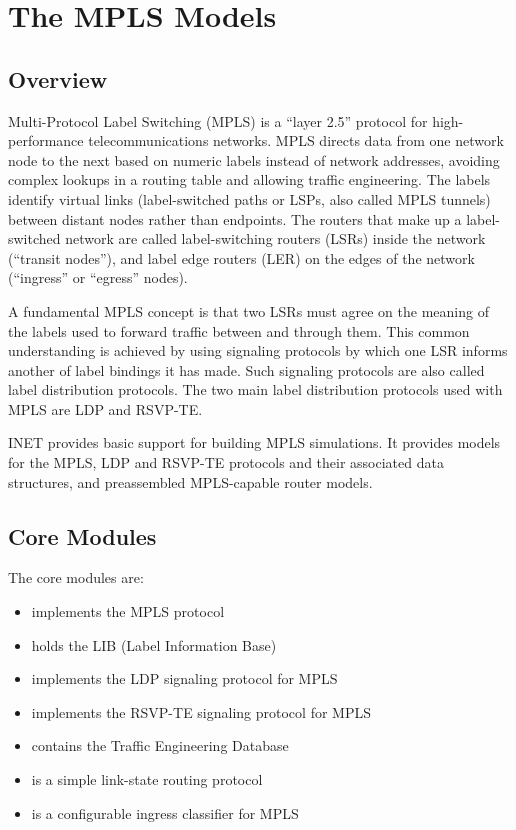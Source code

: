 \chapter{The MPLS Models}
\label{cha:mpls}

\section{Overview}

Multi-Protocol Label Switching (MPLS) is a ``layer 2.5'' protocol for
high-performance telecommunications networks. MPLS directs data from one network
node to the next based on numeric labels instead of network addresses, avoiding
complex lookups in a routing table and allowing traffic engineering.
The labels identify virtual links (label-switched paths or LSPs, also
called MPLS tunnels) between distant nodes rather than endpoints. The routers
that make up a label-switched network are called label-switching routers (LSRs)
inside the network (``transit nodes''), and label edge routers (LER) on the
edges of the network (``ingress'' or ``egress'' nodes).

A fundamental MPLS concept is that two LSRs must agree on the meaning of the
labels used to forward traffic between and through them.
This common understanding is achieved by using signaling protocols by which one
LSR informs another of label bindings it has made. Such signaling protocols are
also called label distribution protocols. The two main label distribution
protocols used with MPLS are LDP and RSVP-TE.

INET provides basic support for building MPLS simulations. It provides models
for the MPLS, LDP and RSVP-TE protocols and their associated data structures,
and preassembled MPLS-capable router models. 

\section{Core Modules}

The core modules are:

\begin{itemize}
  \item {} implements the MPLS protocol 
  \item {} holds the LIB (Label Information Base)
  \item {} implements the LDP signaling protocol for MPLS 
  \item {} implements the RSVP-TE signaling protocol for MPLS 
  \item {} contains the Traffic Engineering Database 
  \item {} is a simple link-state routing protocol
  \item {} is a configurable ingress classifier for MPLS
\end{itemize}

